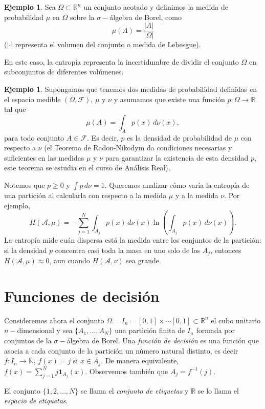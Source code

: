\documentclass[12pt, a4paper]{amsbook}
\newcommand{\R}{{\mathbb R}}
\newcommand{\N}{{\mathbb N}}
\newcommand{\F}{{\mathcal F}}
\newcommand{\A}{{\mathcal A}}
\newcommand{\I}{{\mathbf 1}}
\theoremstyle{remark}
\theoremstyle{definition}
\newtheorem{ejem}[teo]{Ejemplo}
\numberwithin{section}{chapter}
\numberwithin{subsection}{section}
\numberwithin{equation}{section}
\numberwithin{figure}{chapter}
\begin{document}
\begin{ejem}
Sea $\Omega\subset\R^n$ un conjunto acotado y definimos la medida de probabilidad $\mu$ en $\Omega$ sobre la $\sigma-$álgebra de Borel, como
$$
\mu(A) = \frac{|A|}{|\Omega|}
$$
($|\cdot|$ representa el volumen del conjunto o medida de Lebesgue).

En este caso, la entropía representa la incertidumbre de dividir el conjunto $\Omega$ en subconjuntos de diferentes volúmenes.
\end{ejem}

\begin{ejem}
Supongamos que tenemos dos medidas de probabilidad definidas en el espacio medible $(\Omega, \F)$, $\mu$ y $\nu$ y asumamos que existe una función $p\colon \Omega\to\R$ tal que
$$
\mu(A) = \int_A p(x)\, d\nu(x),
$$
para todo conjunto $A\in\F$. Es decir, $p$ es la densidad de probabilidad de $\mu$ con respecto a $\nu$ (el Teorema de Radon-Nikodym da condiciones necesarias y suficientes en las medidas $\mu$ y $\nu$ para garantizar la existencia de esta densidad $p$, este teorema se estudia en el curso de Análisis Real).

Notemos que $p\ge0$ y $\int p\,d\nu=1$. Queremos analizar cómo varía la entropía de una partición al calcularla con respecto a la medida $\mu$ y a la medida $\nu$. Por ejemplo,
$$
H(\A, \mu) = -\sum_{j=1}^N \int_{A_j} p(x)\, d\nu(x) \ln\left(\int_{A_j} p(x)\, d\nu(x)\right).
$$
La entropía mide cuán dispersa está la medida entre los conjuntos de la partición: si la densidad $p$ concentra casi toda la masa en uno solo de los $A_j$, entonces $H(\A,\mu)\approx0$, aun cuando $H(\A,\nu)$ sea grande.
\end{ejem}

\section{Funciones de decisión}\label{sec.c10.3}

Consideremos ahora el conjunto $\Omega = I_n = [0,1]\times\cdots[0,1]\subset \R^n$ el cubo unitario $n-$dimensional y sea $\{A_1,\dots,A_N\}$ una partición finita de $I_n$ formada por conjuntos de la $\sigma-$álgebra de Borel. Una {\em función de decisión} es una función que asocia a cada conjunto de la partición un número natural distinto, es decir $f\colon I_n\to\N$, $f(x) = j$ si $x\in A_j$. De manera equivalente, $f(x)=\sum_{j=1}^N j \I_{A_j}(x)$. Observemos también que $A_j = f^{-1}(j)$.

El conjunto $\{1,2,\dots,N\}$ se llama el {\em conjunto de etiquetas} y $\R$ se lo llama el {\em espacio de etiquetas}.
\end{document}
